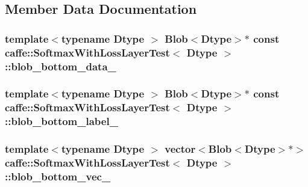 \subsection{Member Data Documentation}
\hypertarget{classcaffe_1_1_softmax_with_loss_layer_test_a721c2ff4fd9ab7412df32c9c05312e8b}{
\subsubsection[{blob\+\_\+bottom\+\_\+data\+\_\+}]{\setlength{\rightskip}{0pt plus 5cm}template$<$typename Dtype $>$ {\bf Blob}$<$Dtype$>$$\ast$ const {\bf caffe\+::\+Softmax\+With\+Loss\+Layer\+Test}$<$ Dtype $>$\+::blob\+\_\+bottom\+\_\+data\+\_\+\hspace{0.3cm}{\ttfamily [protected]}}}\label{classcaffe_1_1_softmax_with_loss_layer_test_a721c2ff4fd9ab7412df32c9c05312e8b}
\hypertarget{classcaffe_1_1_softmax_with_loss_layer_test_ac1e54f604f9677d369902ed78a7e7a7b}{
\subsubsection[{blob\+\_\+bottom\+\_\+label\+\_\+}]{\setlength{\rightskip}{0pt plus 5cm}template$<$typename Dtype $>$ {\bf Blob}$<$Dtype$>$$\ast$ const {\bf caffe\+::\+Softmax\+With\+Loss\+Layer\+Test}$<$ Dtype $>$\+::blob\+\_\+bottom\+\_\+label\+\_\+\hspace{0.3cm}{\ttfamily [protected]}}}\label{classcaffe_1_1_softmax_with_loss_layer_test_ac1e54f604f9677d369902ed78a7e7a7b}
\hypertarget{classcaffe_1_1_softmax_with_loss_layer_test_a49effa55c84063f059bb43eb29ae7684}{
\subsubsection[{blob\+\_\+bottom\+\_\+vec\+\_\+}]{\setlength{\rightskip}{0pt plus 5cm}template$<$typename Dtype $>$ vector$<${\bf Blob}$<$Dtype$>$$\ast$$>$ {\bf caffe\+::\+Softmax\+With\+Loss\+Layer\+Test}$<$ Dtype $>$\+::blob\+\_\+bottom\+\_\+vec\+\_\+\hspace{0.3cm}{\ttfamily [protected]}}}\label{classcaffe_1_1_softmax_with_loss_layer_test_a49effa55c84063f059bb43eb29ae7684}
